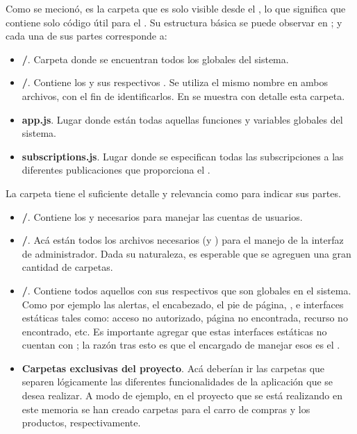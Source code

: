 

Como se mecionó, \clientFolder es la carpeta que es solo visible desde el \clientSideAS, lo que significa que contiene solo código útil para el \clientAS. Su estructura básica se puede observar en ; y cada una de sus partes corresponde a:

	\begin{itemize}
		\item
			\textbf{\helpersMETEOR/}. Carpeta donde se encuentran todos los \helpersMETEOR globales del sistema.
		\item
			\textbf{\templatesMETEOR/}. Contiene los \templatesMETEOR y sus respectivos \helpersMETEOR. Se utiliza el mismo nombre en ambos archivos, con el fin de identificarlos. En  se muestra con detalle esta carpeta.
		\item
			\textbf{app.js}. Lugar donde están todas aquellas funciones y variables globales del sistema.
		\item
			\textbf{subscriptions.js}. Lugar donde se especifican todas las subscripciones a las diferentes publicaciones que proporciona el \serverAS.
	\end{itemize}



La carpeta \templateMETEOR tiene el suficiente detalle y relevancia como para indicar sus partes.

\begin{itemize}
	\item
		\textbf{\folderAccount/}. Contiene los \templatesMETEOR y \helpersMETEOR necesarios para manejar las cuentas de usuarios. 
	\item
		\textbf{\folderDashboard/}. Acá están todos los archivos necesarios (\templatesMETEOR y \helpersMETEOR) para el manejo de la interfaz de administrador. Dada su naturaleza, es esperable que se agreguen una gran cantidad de carpetas.
	\item
		\textbf{\folderLayout/}. Contiene todos aquellos \templatesMETEOR con sus respectivos \helpersMETEOR que son globales en el sistema. Como por ejemplo las alertas, el encabezado, el pie de página, \loadingCPT, e interfaces estáticas tales como: acceso no autorizado, página no encontrada, recurso no encontrado, etc. Es importante agregar que estas interfaces estáticas no cuentan con \helpersMETEOR; la razón tras esto es que el encargado de manejar esos \templatesMETEOR es el \packagesAS \nameRouter.
	\item
		\textbf{Carpetas exclusivas del proyecto}. Acá deberían ir las carpetas que separen lógicamente las diferentes funcionalidades de la aplicación que se desea realizar. A modo de ejemplo, en el proyecto que se está realizando en este memoria se han creado carpetas para el carro de compras y los productos, respectivamente.
\end{itemize}

